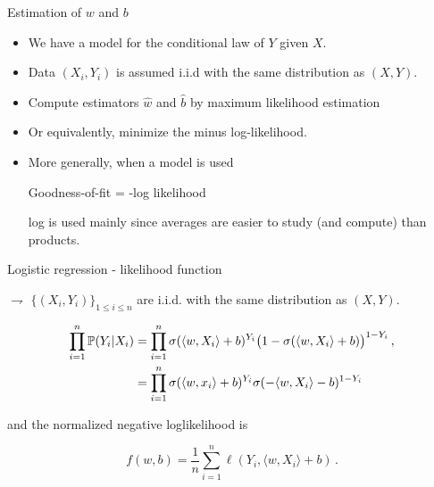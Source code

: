 \documentclass[xcolor={usenames,dvipsnames}]{beamer}
\begin{document}
\begin{frame}{Estimation of $w$ and $b$}

\begin{itemize}
\item We have a model for the conditional law of $Y$ given $X$.
\item Data $(X_i , Y_i)$ is assumed i.i.d with the same distribution as $(X,Y)$.
\item Compute estimators $\hat{w}$ and $\hat{b}$ by maximum likelihood estimation
\item Or equivalently, minimize the minus log-likelihood.
\item  More generally, when a model is used
\begin{center}
Goodness-of-fit = -log likelihood
\end{center}
log is used mainly since averages are easier to study (and compute) than products.
\end{itemize}  
\end{frame}

\begin{frame}{Logistic regression - likelihood function}

$\rightharpoondown$   $\{(X_i,Y_i)\}_{1\leqslant i\leqslant n}$ are \alert{i.i.d. with the same distribution as $(X,Y)$}.

{\bf{}}

\begin{align*}
 \prod_{i=1}^n \P(Y_i | X_i) &= \prod_{i=1}^n \sigma(\langle w,X_i \rangle + b)^{Y_i} \big(1 - 
\sigma(\langle w,X_i \rangle + b) \big)^{1 - Y_i}\,, \\
& = \prod_{i=1}^n \sigma(\langle w,x_i \rangle + b)^{Y_i} 
\sigma(-\langle w,X_i \rangle - b)^{1 - Y_i}
\end{align*}
\smallskip

and the \alert{normalized negative loglikelihood} is 
\smallskip

\begin{equation*}
f(w,b) = \frac{1}{n}\sum_{i=1}^n \ell(Y_i, \langle w,X_i \rangle + b)\,.
\end{equation*}
\end{frame}
\end{document}
